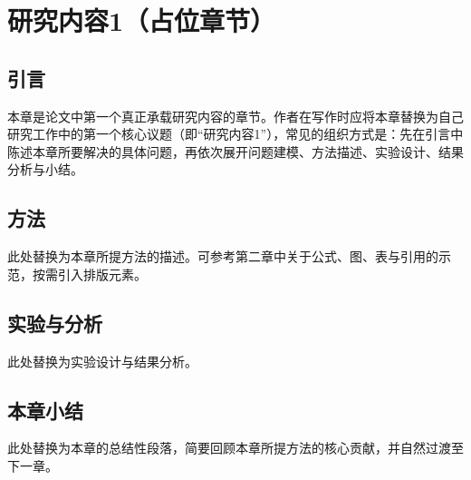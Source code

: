 \clearpage

\section{研究内容1（占位章节）}

\subsection{引言}

本章是论文中第一个真正承载研究内容的章节。作者在写作时应将本章替换为自己研究工作中的第一个核心议题（即“研究内容1”），常见的组织方式是：先在引言中陈述本章所要解决的具体问题，再依次展开问题建模、方法描述、实验设计、结果分析与小结。

\subsection{方法}

此处替换为本章所提方法的描述。可参考第二章中关于公式、图、表与引用的示范，按需引入排版元素。

\subsection{实验与分析}

此处替换为实验设计与结果分析。

\subsection{本章小结}

此处替换为本章的总结性段落，简要回顾本章所提方法的核心贡献，并自然过渡至下一章。
